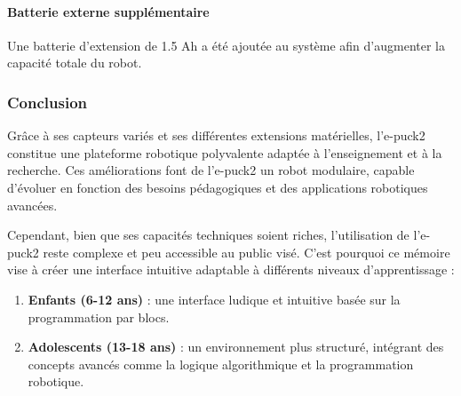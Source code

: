 \paragraph{Batterie externe supplémentaire} Une batterie d'extension de 1.5 Ah a été ajoutée au système afin d'augmenter la capacité totale du robot.

\subsubsection{Conclusion}
Grâce à ses capteurs variés et ses différentes extensions matérielles, l'e-puck2 constitue une plateforme robotique polyvalente adaptée à l'enseignement et à la recherche.
Ces améliorations font de l'e-puck2 un robot modulaire, capable d'évoluer en fonction des besoins pédagogiques et des applications robotiques avancées.

Cependant, bien que ses capacités techniques soient riches, l'utilisation de l'e-puck2 reste complexe et peu accessible au public visé.
C'est pourquoi ce mémoire vise à créer une interface intuitive adaptable à différents niveaux d'apprentissage :
\begin{enumerate}
    \item \textbf{Enfants (6-12 ans)} : une interface ludique et intuitive basée sur la programmation par blocs.
    \item \textbf{Adolescents (13-18 ans)} : un environnement plus structuré, intégrant des concepts avancés comme la logique algorithmique et la programmation robotique.
\end{enumerate}
